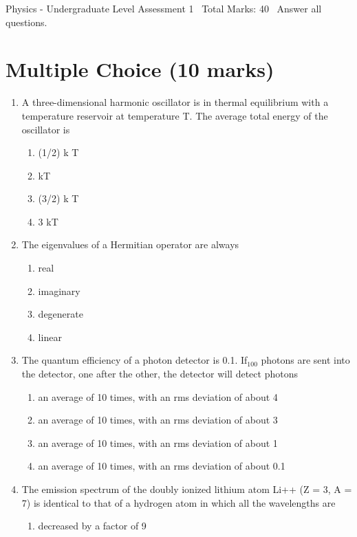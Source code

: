 \documentclass[12pt]{article}
\begin{document}
\begin{center}
Physics - Undergraduate Level Assessment 1 \
Total Marks: 40 \
Answer all questions.
\end{center}

\section*{Multiple Choice (10 marks)}
\begin{enumerate}[label=\arabic*.]
\item A three-dimensional harmonic oscillator is in thermal equilibrium with a temperature reservoir at temperature T. The average total energy of the oscillator is
\begin{enumerate}[label=(\alph*)]
    \item (1/2) k T
    \item kT
    \item (3/2) k T
    \item 3 kT
\end{enumerate}
\item The eigenvalues of a Hermitian operator are always
\begin{enumerate}[label=(\alph*)]
    \item real
    \item imaginary
    \item degenerate
    \item linear
\end{enumerate}
\item The quantum efficiency of a photon detector is 0.1. If$_{100}$ photons are sent into the detector, one after the other, the detector will detect photons
\begin{enumerate}[label=(\alph*)]
    \item an average of 10 times, with an rms deviation of about 4
    \item an average of 10 times, with an rms deviation of about 3
    \item an average of 10 times, with an rms deviation of about 1
    \item an average of 10 times, with an rms deviation of about 0.1
\end{enumerate}
\item The emission spectrum of the doubly ionized lithium atom Li++ (Z = 3, A = 7) is identical to that of a hydrogen atom in which all the wavelengths are
\begin{enumerate}[label=(\alph*)]
    \item decreased by a factor of 9

\end{enumerate}
\end{enumerate}
\end{document}
